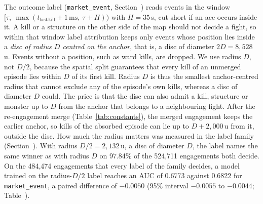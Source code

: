 The outcome label (\texttt{market\_event}, Section~) reads events in the window
$[\tau,\ \max(t_{\mathrm{last\,kill}} + 1\,\mathrm{ms},\ \tau + H))$ with $H = 35$\,s, cut short if an
ace occurs inside it.
A kill or a structure on the other side of the map should not decide a fight, so within that window
label attribution keeps only events whose position lies inside a \emph{disc of radius $D$ centred on the
anchor}, that is, a disc of diameter $2D = 8{,}528$\,u. Events without a position, such as ward kills,
are dropped.
We use radius $D$, not $D/2$, because the spatial split guarantees that every kill of an unmerged
episode lies within $D$ of its first kill. Radius $D$ is thus the smallest anchor-centred radius that
cannot exclude any of the episode's own kills, whereas a disc of diameter $D$ could. The price is that
the disc can also admit a kill, structure or monster up to $D$ from the anchor that belongs to a
neighbouring fight. After the re-engagement merge (Table~\ref{tab:constants}), the merged engagement
keeps the earlier anchor, so kills of the absorbed episode can lie up to $D + 2{,}000$\,u from it,
outside the disc.
How much the radius matters was measured in the label family (Section~). With
radius $D/2 = 2{,}132$\,u, a disc of diameter $D$, the label names the same winner as with radius $D$ on
97.84\% of the 524,711 engagements both decide. On the 484,474 engagements that every label of the family
decides, a model trained on the radius-$D/2$ label reaches an AUC of 0.6773 against 0.6822 for
\texttt{market\_event}, a paired difference of $-0.0050$ (95\% interval $-0.0055$ to $-0.0044$;
Table~).

